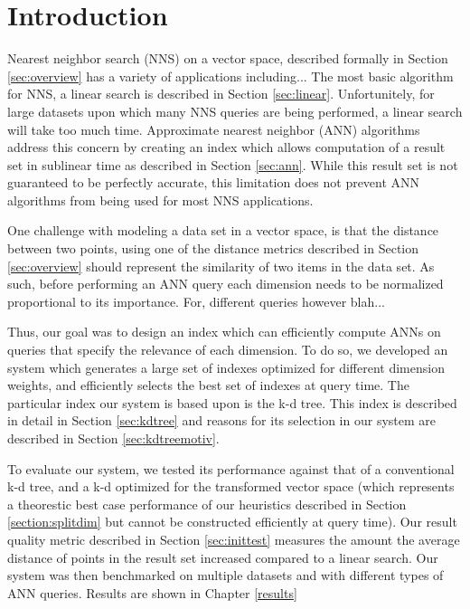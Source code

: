 \chapter{Introduction} %

\label{futurework} %


Nearest neighbor search (NNS) on a vector space, described formally in Section \ref{sec:overview} has a variety of applications including... The most basic algorithm for NNS, a linear search is described in Section \ref{sec:linear}.  Unfortunitely, for large datasets upon which many NNS queries are being performed, a linear search will take too much time.  Approximate nearest neighbor (ANN) algorithms address this concern by creating an index which allows computation of a result set in sublinear time as described in Section \ref{sec:ann}. While this result set is not guaranteed to be perfectly accurate, this limitation does not prevent ANN algorithms from being used for most NNS applications.

One challenge with modeling a data set in a vector space, is that the distance between two points, using one of the distance metrics described in Section \ref{sec:overview} should represent the similarity of two items in the data set.  As such, before performing an ANN query each dimension needs to be normalized proportional to its importance.  For, different queries however blah...

Thus, our goal was to design an index which can efficiently compute ANNs on queries that specify the relevance of each dimension.  To do so, we developed an system which generates a large set of indexes optimized for different dimension weights, and efficiently selects the best set of indexes at query time.  The particular index our system is based upon is the k-d tree.  This index is described in detail in Section \ref{sec:kdtree} and reasons for its selection in our system are described in Section \ref{sec:kdtreemotiv}.

To evaluate our system, we tested its performance against that of a conventional k-d tree, and a k-d optimized for the transformed vector space (which represents a theorestic best case performance of our heuristics described in Section \ref{section:splitdim} but cannot be constructed efficiently at query time).  Our result quality metric described in Section \ref{sec:inittest} measures the amount the average distance of points in the result set increased compared to a linear search.  Our system was then benchmarked on multiple datasets and with different types of ANN queries.  Results are shown in Chapter \ref{results}